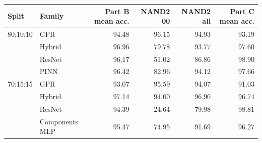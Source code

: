 \begin{tabular}{llrrrr}
\toprule
Split & Family & Part B mean acc. & NAND2 00 & NAND2 all & Part C mean acc. \\
\midrule
80:10:10 & GPR & 94.48 & 96.15 & 94.93 & 93.19 \\
 & Hybrid & 96.96 & 79.78 & 93.77 & 97.60 \\
 & ResNet & 96.17 & 51.02 & 86.86 & 98.90 \\
 & PINN & 96.42 & 82.96 & 94.12 & 97.66 \\
\midrule
70:15:15 & GPR & 93.07 & 95.59 & 94.07 & 91.03 \\
 & Hybrid & 97.14 & 94.00 & 96.90 & 96.74 \\
 & ResNet & 94.39 & 24.64 & 79.98 & 98.81 \\
 & Components MLP & 95.47 & 74.95 & 91.69 & 96.27 \\
\bottomrule
\end{tabular}
